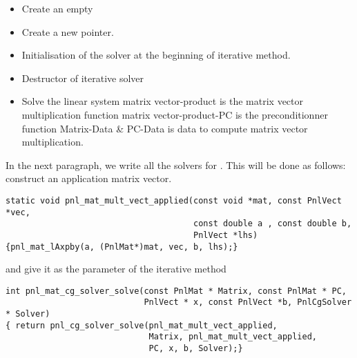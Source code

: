 \begin{itemize}
  \item {}
    \sshortdescribe Create an empty   
\item {}
  \sshortdescribe Create a new  pointer.  
\item {}
  \sshortdescribe Initialisation of the solver at the beginning of iterative method.  
\item {}
  \sshortdescribe Destructor of iterative solver  
\item {}
  \sshortdescribe Solve the linear system matrix vector-product is the matrix vector multiplication function matrix vector-product-PC is the preconditionner function Matrix-Data \& PC-Data is data to compute matrix vector multiplication.  
\end{itemize}


In the next paragraph, we write all the solvers for \PnlMat. This
will be done as follows: construct an application matrix vector.
\begin{verbatim}
static void pnl_mat_mult_vect_applied(const void *mat, const PnlVect *vec, 
                                      const double a , const double b, 
                                      PnlVect *lhs)
{pnl_mat_lAxpby(a, (PnlMat*)mat, vec, b, lhs);}
\end{verbatim}
and give it as the parameter of the iterative method
\begin{verbatim}
int pnl_mat_cg_solver_solve(const PnlMat * Matrix, const PnlMat * PC, 
                            PnlVect * x, const PnlVect *b, PnlCgSolver * Solver)
{ return pnl_cg_solver_solve(pnl_mat_mult_vect_applied, 
                             Matrix, pnl_mat_mult_vect_applied, 
                             PC, x, b, Solver);}
\end{verbatim}

